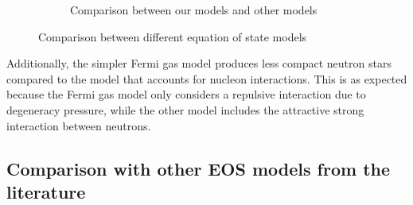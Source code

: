 \documentclass[draft,11pt]{article}
\theoremstyle{definition}
\theoremstyle{remark}
\begin{document}
\begin{figure}[h]
\begin{center}
\begin{subfigure}[b]{.49\textwidth}
                    \caption{Comparison between our models and other models}\label{fig/comparison.paper}
                \end{subfigure}
                \caption{Comparison between different equation of state models}
            \end{center}\end{figure}
            
            Additionally, the simpler Fermi gas model produces less compact neutron stars compared to the model that accounts for nucleon interactions. This is as expected because the Fermi gas model only considers a repulsive interaction due to degeneracy pressure, while the other model includes the attractive strong interaction between neutrons.
        
        \subsection{Comparison with other EOS models from the literature}
            
        
\end{document}
